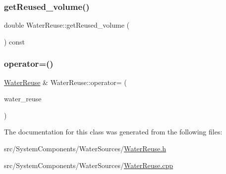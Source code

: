 \subsubsection{\texorpdfstring{get\+Reused\+\_\+volume()}{getReused\_volume()}}
{\footnotesize\ttfamily double Water\+Reuse\+::get\+Reused\+\_\+volume (\begin{DoxyParamCaption}{ }\end{DoxyParamCaption}) const}

\mbox{\label{classWaterReuse_a8bf201adfc25021511d8844cd056d5bf}} 
\subsubsection{\texorpdfstring{operator=()}{operator=()}}
{\footnotesize\ttfamily \mbox{\hyperlink{classWaterReuse}{Water\+Reuse}} \& Water\+Reuse\+::operator= (\begin{DoxyParamCaption}\item[{const \mbox{\hyperlink{classWaterReuse}{Water\+Reuse}} \&}]{water\+\_\+reuse }\end{DoxyParamCaption})}



The documentation for this class was generated from the following files\+:\begin{DoxyCompactItemize}
\item 
src/\+System\+Components/\+Water\+Sources/\mbox{\hyperlink{WaterReuse_8h}{Water\+Reuse.\+h}}\item 
src/\+System\+Components/\+Water\+Sources/\mbox{\hyperlink{WaterReuse_8cpp}{Water\+Reuse.\+cpp}}\end{DoxyCompactItemize}
